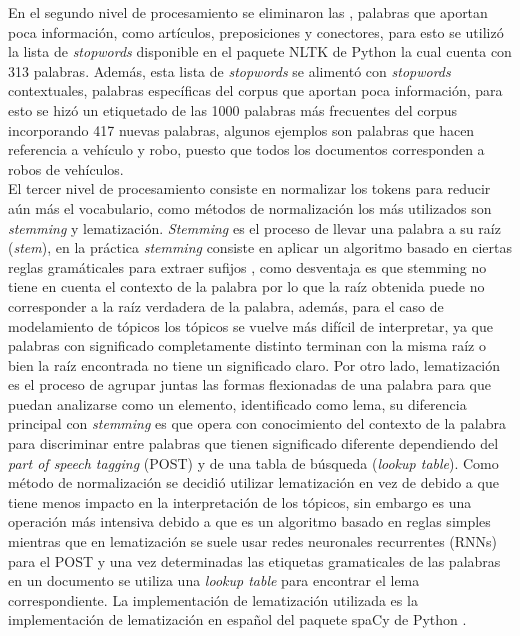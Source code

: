 \documentclass[letterpaper,12pt,oneside]{book} %
\begin{document}
En el segundo nivel de procesamiento se eliminaron las , palabras que aportan poca información, como artículos, preposiciones y conectores, para esto se utilizó la lista de \textit{stopwords} disponible en el paquete NLTK de Python \citep{bird2009natural} la cual cuenta con 313 palabras. Además, esta lista de \textit{stopwords} se alimentó con \textit{stopwords} contextuales, palabras específicas del corpus que aportan poca información, para esto se hizó un etiquetado de las 1000 palabras más frecuentes del corpus incorporando 417 nuevas palabras, algunos ejemplos son palabras que hacen referencia a vehículo y robo, puesto que todos los documentos corresponden a robos de vehículos.\\

El tercer nivel de procesamiento consiste en normalizar los tokens para reducir aún más el vocabulario, como métodos de normalización los más utilizados son \textit{stemming}  y lematización. \textit{Stemming} es el proceso de llevar una palabra a su raíz (\textit{stem}), en la práctica \textit{stemming} consiste en aplicar un algoritmo basado en ciertas reglas gramáticales para extraer sufijos \citep{porter1980algorithm}, como desventaja es que stemming no tiene en cuenta el contexto de la palabra por lo que la raíz obtenida puede no corresponder a la raíz verdadera de la palabra, además, para el caso de modelamiento de tópicos los tópicos se vuelve más difícil de interpretar, ya que palabras con significado completamente distinto terminan con la misma raíz o bien la raíz encontrada no tiene un significado claro. Por otro lado, lematización es el proceso de agrupar juntas las formas flexionadas de una palabra para que puedan analizarse como un elemento, identificado como lema, su diferencia principal con \textit{stemming} es que opera con conocimiento del contexto de la palabra para discriminar entre palabras que tienen significado diferente dependiendo del \textit{part of speech tagging} (POST) y de una tabla de búsqueda (\textit{lookup table}). Como método de normalización se decidió utilizar lematización en vez de  debido a que tiene menos impacto en la interpretación de los tópicos, sin embargo es una operación más intensiva debido a que  es un algoritmo basado en reglas simples mientras que en lematización se suele usar redes neuronales recurrentes (RNNs) para el POST y una vez determinadas las etiquetas gramaticales de las palabras en un documento se utiliza una \textit{lookup table} para encontrar el lema correspondiente. La implementación de lematización utilizada es la implementación de lematización en español del paquete spaCy de Python \citep{spacy2}.\\
\end{document}
